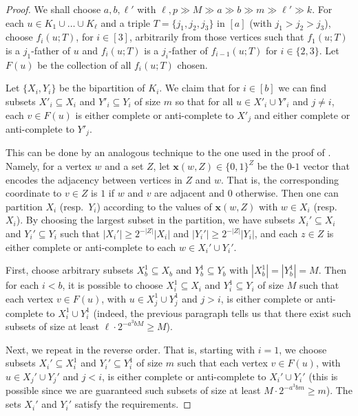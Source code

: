 \documentclass[11pt,english]{article}
\theoremstyle{plain}
\theoremstyle{definition}
\theoremstyle{remark}
\begin{document}
    \begin{proof}
        We shall choose $a,b, \ell'$ with $\ell,p\gg M \gg a\gg b\gg m\gg \ell'\gg k$.
        For each $u\in K_1\cup \dots\cup K_{\ell}$ and a triple $T=\{j_1,j_2,j_3\}$ in $[a]$ (with $j_1 > j_2 > j_3$), choose $f_i(u;T)$, for $i\in [3]$, arbitrarily from those vertices such that $f_1(u;T)$ is a $j_1$-father of $u$ and $f_i(u;T)$ is a $j_i$-father of $f_{i-1}(u;T)$ for $i \in \{2, 3\}$.
        Let $F(u)$ be the collection of all $f_i(u;T)$ chosen.
                    
        Let $\{X_i, Y_i\}$ be the bipartition of $K_{i}$. We claim that for $i \in [b]$ we can find subsets $X'_i\subseteq X_i$ and $Y'_i\subseteq Y_i$ of size $m$ so that for all $u\in X'_i\cup Y'_i$ and $j\neq i$, each $v\in F(u)$ is either complete or anti-complete to $X'_j$ and either complete or anti-complete to $Y'_j$. 
    
        This can be done by an analogous technique to the one used in the proof of .
        Namely, for a vertex $w$ and a set $Z$, let $\mathbf{x}(w,Z)\in\{0,1\}^{Z}$ be the $0$-$1$ vector that encodes the adjacency between vertices in $Z$ and $w$. That is, the corresponding coordinate to $v\in Z$ is $1$ if $w$ and $v$ are adjacent and 0 otherwise.
        Then one can partition $X_i$ (resp.\ $Y_i$) according to the values of $\mathbf{x}(w,Z)$ with $w\in X_i$ (resp.\ $X_i$). By choosing the largest subset in the partition, we have subsets $X_i'\subseteq X_i$ and $Y_i'\subseteq Y_i$ such that $|X_i'|\geq 2^{-|Z|}|X_i|$ and $|Y_i'|\geq 2^{-|Z|}|Y_i|$, and each $z\in Z$ is either complete or anti-complete to each $w\in X_i'\cup Y_i'$.
    
        First, choose arbitrary subsets $X_b^1\subseteq X_b$ and $Y_b^1\subseteq Y_b$ with $|X_b^1| = |Y_b^1| = M$. Then for each $i<b$, it is possible to choose $X_i^1 \subseteq X_i$ and $Y_i^1\subseteq Y_i$ of size $M$ such that each vertex $v\in F(u)$, with $u\in X_j^1\cup Y_j^1$ and $j>i$, is either complete or anti-complete to $X_i^1\cup Y_i^1$ (indeed, the previous paragraph tells us that there exist such subsets of size at least $\ell \cdot 2^{-a^3 b M} \ge M$).
        
        Next, we repeat in the reverse order. That is, starting with $i = 1$, we choose subsets $X_i' \subseteq X_i^1$ and $Y_i'\subseteq Y_i^1$ of size $m$ such that each vertex $v\in F(u)$, with $u\in X_j'\cup Y_j'$ and $j<i$, is either complete or anti-complete to $X_i'\cup Y_i'$ (this is possible since we are guaranteed such subsets of size at least $M \cdot 2^{-a^3 b m} \ge m$). The sets $X_i'$ and $Y_i'$ satisfy the requirements.
    

\end{proof}
\end{document}
